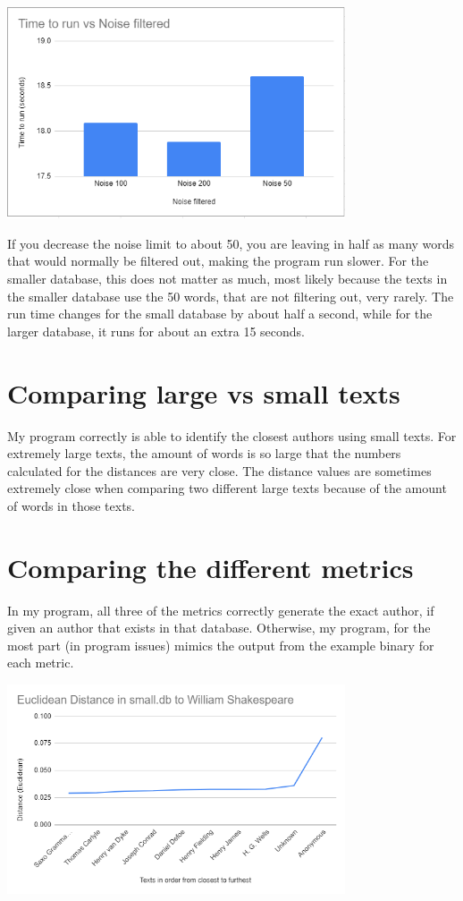 \documentclass[11pt]{article}
\begin{document}
\includegraphics[width = 0.75\textwidth]{Graphs/Noise.PNG}

If you decrease the noise limit to about 50, you are leaving in half as many words that would normally be filtered out, making the program run slower. For the smaller database, this does not matter as much, most likely because the texts in the smaller database use the 50 words, that are not filtering out, very rarely. The run time changes for the small database by about half a second, while for the larger database, it runs for about an extra 15 seconds. 

\section{Comparing large vs small texts}\label{ss:size}
My program correctly is able to identify the closest authors using small texts. For extremely large texts, the amount of words is so large that the numbers calculated for the distances are very close. The distance values are sometimes extremely close when comparing two different large texts because of the amount of words in those texts.

\section{Comparing the different metrics}\label{ss:metrics}
In my program, all three of the metrics correctly generate the exact author, if given an author that exists in that database. Otherwise, my program, for the most part (in program issues) mimics the output from the example binary for each metric.

\includegraphics[width = 0.75\textwidth]{Graphs/Euclidean.PNG}
\end{document}
